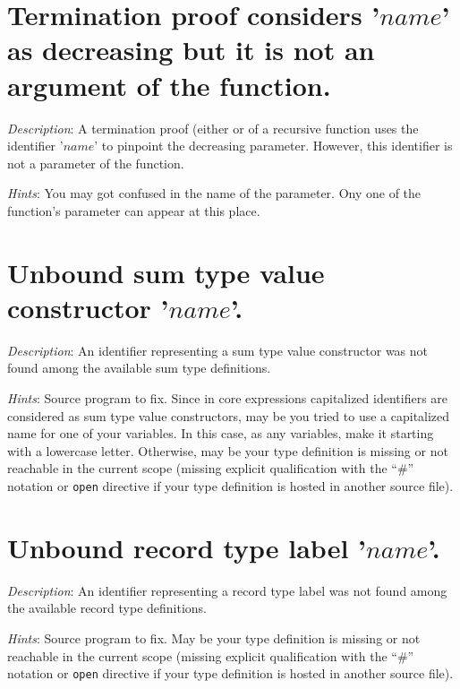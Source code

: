 \section*{Termination proof considers '$name$' as decreasing but it is not
  an argument of the function.}

{\em Description}: A termination proof (either  or
 of a recursive function uses the identifier '$name$'
to pinpoint the decreasing parameter. However, this identifier is not a
parameter of the function.

{\em Hints}: You may got confused in the name of the parameter. Ony one of
the function's parameter can appear at this place.



\section*{Unbound sum type value constructor '$name$'.}
{\em Description}: An identifier representing a sum type value constructor
was not found among the available sum type definitions.

{\em Hints}: Source program to fix. Since in core expressions
capitalized identifiers are considered as sum type value constructors,
may be you tried to use a capitalized name for one of your
variables. In this case, as any variables, make it starting with a
lowercase letter. Otherwise, may be your type definition is missing or
not reachable in the current scope (missing explicit qualification
with the ``\#'' notation or {\tt open} directive if your type
definition is hosted in another source file).



\section*{Unbound record type label '$name$'.}
{\em Description}: An identifier representing a record type label
was not found among the available record type definitions.

{\em Hints}: Source program to fix. May be your type definition is
missing or not reachable in the current scope (missing explicit
qualification with the ``\#'' notation or {\tt open} directive if your
type definition is hosted in another source file).



